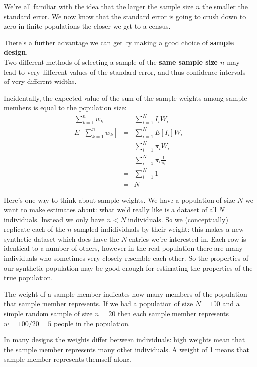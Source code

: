 \documentclass[
]{book}
\begin{document}
We're all familiar with the idea that the larger the sample size \(n\) the smaller the
standard error. We now know that the standard error is going to crush down to zero
in finite populations the closer we get to a census.

There's a further advantage we can get by making a good choice of \textbf{sample design}.\\
Two different methods of selecting a sample of the \textbf{same sample size \(n\)} may lead
to very different values of the standard error, and thus confidence intervals of
very different widths.

Incidentally, the expected value of the sum of the sample weights among sample members is equal to
the population size:
\begin{eqnarray}
    \sum_{k=1}^n w_k &=& \sum_{i=1}^N I_i W_i\\
  E\left[\sum_{k=1}^n w_k\right] 
                      &=& \sum_{i=1}^N E[I_i] W_i\\
                      &=& \sum_{i=1}^N \pi_i W_i\\
                      &=& \sum_{i=1}^N \pi_i \frac{1}{\pi_i}\\
                      &=& \sum_{i=1}^N 1\\
                      &=& N
\end{eqnarray}

Here's one way to think about sample weights. We have a population of size \(N\)
we want to make estimates about: what we'd really like is a dataset of all \(N\) individuals.
Instead we only have \(n<N\) individuals. So we (conceptually) replicate each of the \(n\)
sampled indidividuals by their weight: this makes a new synthetic dataset which does
have the \(N\) entries we're interested in. Each row is identical to a number of others,
however in the real population there are many individuals who sometimes very closely
resemble each other. So the properties of our synthetic population may be good enough
for estimating the properties of the true population.

The weight of a sample member indicates how many members of the population that
sample member represents. If we had a population of size \(N=100\) and a simple random
sample of size \(n=20\) then each sample member represents \(w=100/20=5\) people in the
population.

In many designs the weights differ between individuals:
high weights mean that the sample member represents many other individuals. A weight
of 1 means that sample member represents themself alone.
\end{document}
